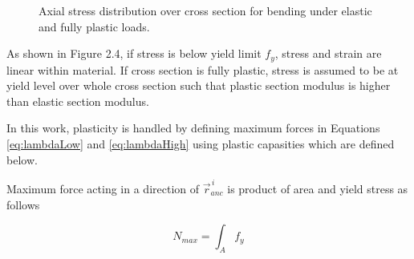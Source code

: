 \begin{figure}[htb!]
\centering
{}
\hspace{1cm}
\caption{Axial stress distribution over cross section for bending under elastic and fully plastic loads.}
\label{fig:wp}
\end{figure}

As shown in Figure 2.4, if stress is below yield limit $f_y$, stress and strain are linear within material.
If cross section is fully plastic, stress is assumed to be at yield level over whole cross section such that 
plastic section modulus is higher than elastic section modulus.

In this work, plasticity is handled by defining maximum forces
in Equations \ref{eq:lambdaLow} and  
\ref{eq:lambdaHigh} using plastic capasities which are defined below.

Maximum force acting in a direction of $\vec{r}_{anc}^{\,i} $
is product of area and yield stress as follows

\begin{equation} \label{eq:fN}
N_{max}= \int_A f_y
\end{equation}

